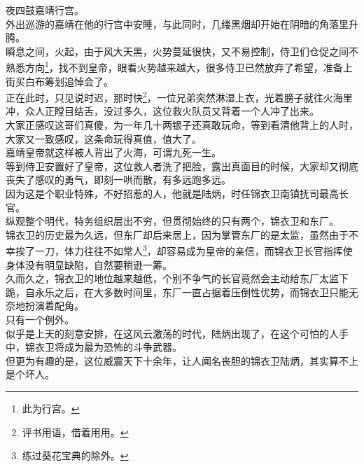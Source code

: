 \begin{multicols}{\theparacolNo}
夜四鼓嘉靖行宫。\\

外出巡游的嘉靖在他的行宫中安睡，与此同时，几缕黑烟却开始在阴暗的角落里升腾。\\

瞬息之间，火起，由于风大天黑，火势蔓延很快，又不易控制，侍卫们仓促之间不熟悉方向\footnote{此为行宫。}，找不到皇帝，眼看火势越来越大，很多侍卫已然放弃了希望，准备上街买白布筹划追悼会了。\\

正在此时，只见说时迟，那时快\footnote{评书用语，借着用用。}，一位兄弟突然淋湿上衣，光着膀子就往火海里冲，众人正瞠目结舌，没过多久，这位救火队员又背着一个人冲了出来。\\

大家正感叹这哥们真傻，为一年几十两银子还真敢玩命，等到看清他背上的人时，大家又一致感叹，这条命玩得真值，值大了。\\

嘉靖皇帝就这样被人背出了火海，可谓九死一生。\\

等到侍卫安置好了皇帝，这位救人者洗了把脸，露出真面目的时候，大家却又彻底丧失了感叹的勇气，即刻一哄而散，有多远跑多远。\\

因为这是个职业特殊，不好招惹的人，他就是陆炳，时任锦衣卫南镇抚司最高长官。\\

纵观整个明代，特务组织层出不穷，但贯彻始终的只有两个，锦衣卫和东厂。\\

锦衣卫的历史最为久远，但东厂却后来居上，因为掌管东厂的是太监，虽然由于不幸挨了一刀，体力往往不如常人\footnote{练过葵花宝典的除外。}，却容易成为皇帝的亲信，而锦衣卫长官指挥使身体没有明显缺陷，自然要稍逊一筹。\\

久而久之，锦衣卫的地位越来越低，个别不争气的长官竟然会主动给东厂太监下跪，自永乐之后，在大多数时间里，东厂一直占据着压倒性优势，而锦衣卫只能无奈地扮演着配角。\\

只有一个例外。\\

似乎是上天的刻意安排，在这风云激荡的时代，陆炳出现了，在这个可怕的人手中，锦衣卫将成为最为恐怖的斗争武器。\\

但更为有趣的是，这位威震天下十余年，让人闻名丧胆的锦衣卫陆炳，其实算不上是个坏人。\\


\end{multicols}
